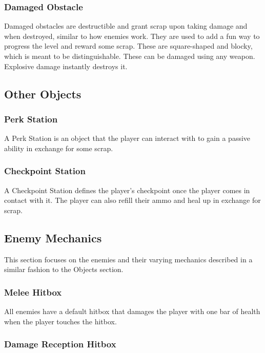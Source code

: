 \documentclass[12pt]{article}
\begin{document}
\subsubsection{Damaged Obstacle}

Damaged obstacles are destructible and grant scrap upon taking damage and when destroyed, similar to how enemies work. They are used to add a fun way to progress the level and reward some scrap. These are square-shaped and blocky, which is meant to be distinguishable. These can be damaged using any weapon. Explosive damage instantly destroys it. 

\subsection{Other Objects}

\subsubsection{Perk Station}

A Perk Station is an object that the player can interact with to gain a passive ability in exchange for some scrap. 

\subsubsection{Checkpoint Station}

A Checkpoint Station defines the player's checkpoint once the player comes in contact with it. The player can also refill their ammo and heal up in exchange for scrap. 

\subsection{Enemy Mechanics}

This section focuses on the enemies and their varying mechanics described in a similar fashion to the Objects section. 

\subsubsection{Melee Hitbox}

All enemies have a default hitbox that damages the player with one bar of health when the player touches the hitbox. 

\subsubsection{Damage Reception Hitbox}
\end{document}
